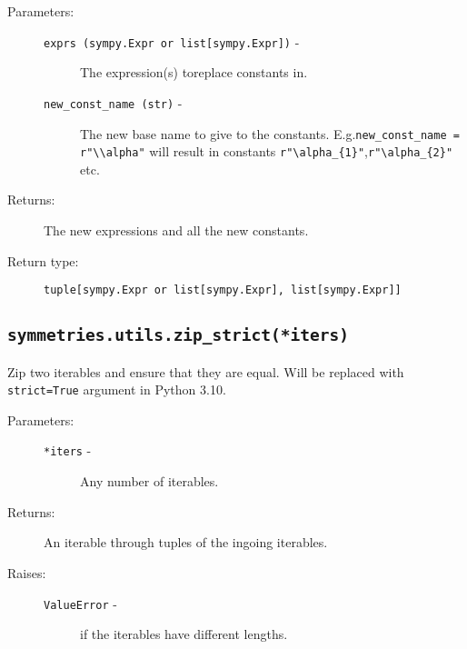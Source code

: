    \begin{description}
      \item[Parameters:] \leavevmode
        \begin{description}
            \item[\lstinline{exprs (sympy.Expr or list[sympy.Expr])} -] The expression(s) to\newline replace constants in.
            \item[\lstinline{new_const_name (str)} -] The new base name to give to the constants. E.g.\newline \lstinline{new_const_name = r"\\alpha"} will result in constants \lstinline|r"\alpha_{1}"|,\newline \lstinline|r"\alpha_{2}"| etc.
        \end{description}
      \item[Returns:] The new expressions and all the new constants.
      \item[Return type:] \lstinline{tuple[sympy.Expr or list[sympy.Expr], list[sympy.Expr]]}
   \end{description}

\subsection*{\lstinline{symmetries.utils.zip_strict(*iters)}}

   Zip two iterables and ensure that they are equal. Will be replaced
   with \lstinline{strict=True} argument in Python 3.10.

   \begin{description}
      \item[Parameters:] \leavevmode
        \begin{description}
          \item[\lstinline{*iters} -] Any number of iterables.
        \end{description}
      \item[Returns:] An iterable through tuples of the ingoing iterables.
      \item[Raises:] \leavevmode
      \begin{description}
        \item[\lstinline{ValueError} -] if the iterables have different lengths.
      \end{description}
   \end{description}     
